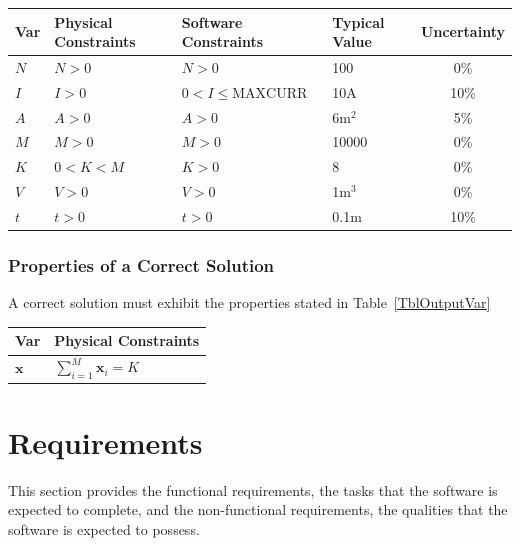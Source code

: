 \documentclass[12pt]{article}
\begin{document}
\begin{table}[!h]
  \caption{Input Variables} \label{TblInputVar}
  \renewcommand{\arraystretch}{1.2}
\noindent \begin{longtable*}{l l l l c} 
  \toprule
  \textbf{Var} & \textbf{Physical Constraints} & \textbf{Software Constraints} &
                             \textbf{Typical Value} & \textbf{Uncertainty}\\
  \midrule 
  $N$ & $N > 0$ & $N > 0$ & 100 & 0\%
  \\
  $I$ & $I > 0$ & $0 < I \leq \text{MAXCURR}$ & 10A & 10\%
  \\
  $A$ & $A > 0$ & $A > 0$ & 6m$^2$ & 5\%
  \\
  $M$ & $M > 0$ & $M > 0$ & 10000 & 0\%
  \\
  $K$ & $0 < K < M$ & $K > 0$ & 8 & 0\%
  \\
  $V$ & $V > 0$ & $V > 0$ & 1m$^3$ & 0\%
  \\
  $t$ & $t > 0$ & $t > 0$ & 0.1m & 10\%
  \\
  \bottomrule
\end{longtable*}
\end{table}

\subsubsection{Properties of a Correct Solution} \label{sec_CorrectSolution}

\noindent
A correct solution must exhibit the properties stated in Table~\ref{TblOutputVar}

\begin{table}[!h]
\caption{Output Variables} \label{TblOutputVar}
\renewcommand{\arraystretch}{1.2}
\noindent \begin{longtable*}{l l} 
  \toprule
  \textbf{Var} & \textbf{Physical Constraints} \\
  \midrule 
  $\bm x$ & $\sum_{i=1}^{M} \bm x_i = K$
  \\
  \bottomrule
\end{longtable*}
\end{table}

\newpage 
\section{Requirements}
This section provides the functional requirements, the tasks that the
software is expected to complete, and the non-functional requirements, the
qualities that the software is expected to possess.
\end{document}
